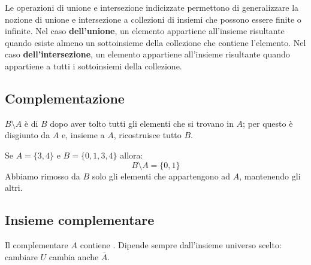 \noindent Le operazioni di unione e intersezione indicizzate permettono di generalizzare la nozione di unione e intersezione a collezioni di insiemi che possono essere finite o infinite. Nel caso \textbf{dell'unione}, un elemento appartiene all'insieme risultante quando esiste almeno un sottoinsieme della collezione che contiene l'elemento. Nel caso \textbf{ dell'intersezione}, un elemento appartiene all'insieme risultante quando appartiene a tutti i sottoinsiemi della collezione.


\subsection{Complementazione }
\(B \setminus A \) è  di \(B\) dopo aver tolto tutti gli elementi che si trovano in \(A\); per questo è disgiunto da \(A\) e, insieme a \(A\), ricostruisce tutto \(B\).
\begin{esempio}
Se $A = \{3,4\}$ e $B=\{0,1,3,4\}$ allora:
\[
   B\setminus A = \{0,1\}
\]
Abbiamo rimosso da \(B\) solo gli elementi che appartengono ad \(A\), mantenendo gli altri.
\end{esempio} 



\subsection{Insieme complementare}
Il complementare \(A\) contiene . Dipende sempre dall'insieme universo scelto: cambiare \(U\) cambia anche \(\overline{A}\).
\begin{center}
\end{center}


